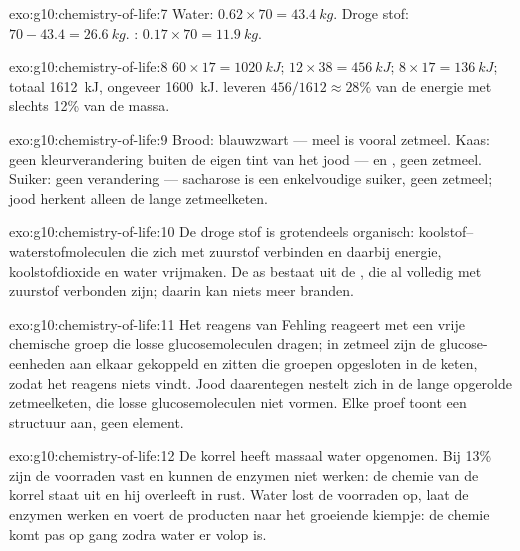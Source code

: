 \begin{solution}{exo:g10:chemistry-of-life:7}
Water: $0.62 \times 70 = \qty{43.4}{kg}$. Droge stof: $70 - 43.4 =
\qty{26.6}{kg}$. : $0.17 \times 70 = \qty{11.9}{kg}$.
\end{solution}

\begin{solution}{exo:g10:chemistry-of-life:8}
 $60 \times 17 = \qty{1020}{kJ}$;  $12 \times 38 =
\qty{456}{kJ}$;  $8 \times 17 = \qty{136}{kJ}$; totaal
\qty{1612}{kJ}, ongeveer \qty{1600}{kJ}.  leveren $456/1612 \approx
28\%$ van de energie met slechts 12\% van de massa.
\end{solution}

\begin{solution}{exo:g10:chemistry-of-life:9}
Brood: blauwzwart --- meel is vooral zetmeel. Kaas: geen kleurverandering
buiten de eigen tint van het jood ---  en , geen zetmeel.
Suiker: geen verandering --- sacharose is een enkelvoudige suiker, geen
zetmeel; jood herkent alleen de lange zetmeelketen.
\end{solution}

\begin{solution}{exo:g10:chemistry-of-life:10}
De droge stof is grotendeels organisch: koolstof--waterstofmoleculen die
zich met zuurstof verbinden en daarbij energie, koolstofdioxide en water
vrijmaken. De as bestaat uit de , die al volledig met
zuurstof verbonden zijn; daarin kan niets meer branden.
\end{solution}

\begin{solution}{exo:g10:chemistry-of-life:11}
Het reagens van Fehling reageert met een vrije chemische groep die
losse glucosemoleculen dragen; in zetmeel zijn de glucose-eenheden aan
elkaar gekoppeld en zitten die groepen opgesloten in de keten, zodat het
reagens niets vindt. Jood daarentegen nestelt zich in de lange
opgerolde zetmeelketen, die losse glucosemoleculen niet vormen. Elke
proef toont een structuur aan, geen element.
\end{solution}

\begin{solution}{exo:g10:chemistry-of-life:12}
De korrel heeft massaal water opgenomen. Bij 13\% zijn de voorraden vast
en kunnen de enzymen niet werken: de chemie van de korrel staat uit en
hij overleeft in rust. Water lost de voorraden op, laat de enzymen
werken en voert de producten naar het groeiende kiempje: de chemie komt
pas op gang zodra water er volop is.
\end{solution}

